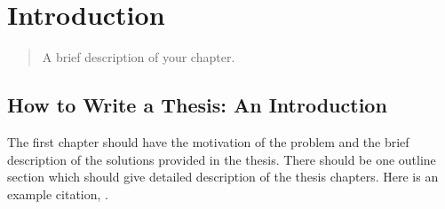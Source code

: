 \chapter{Introduction}
\label{chap:introduction}

\begin{quote} \small
 A brief description of your chapter.
\end{quote}

\section{How to Write a Thesis: An Introduction}

The first chapter should have the motivation of the problem and the brief description of the solutions provided in the thesis. There should be one outline section which should give detailed description of the thesis chapters. Here is an example citation, \cite{Nath2013}.
